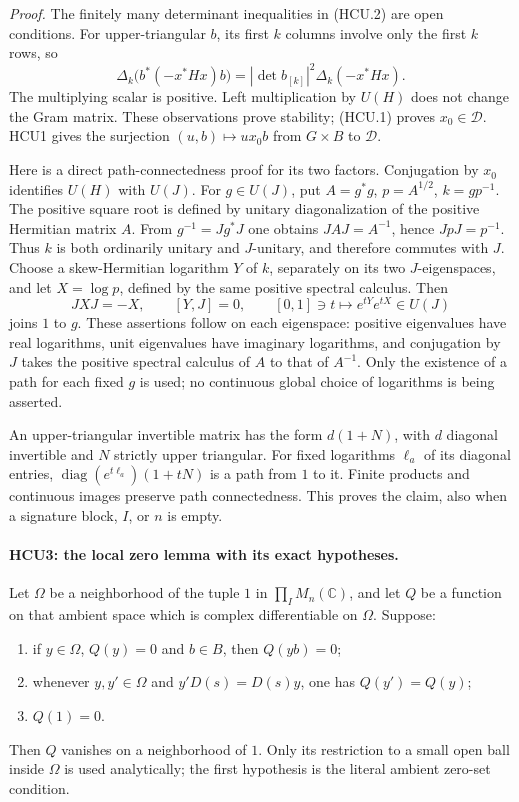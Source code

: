 \emph{Proof.}
The finitely many determinant inequalities in (HCU.2) are open
conditions.  For upper-triangular \(b\), its first \(k\) columns involve
only the first \(k\) rows, so
\[
 \Delta_k\bigl(b^*(-x^*Hx)b\bigr)
   =|\det b_{[k]}|^2\Delta_k(-x^*Hx).
 \tag{HCU.8}
\]
The multiplying scalar is positive.  Left multiplication by \(U(H)\)
does not change the Gram matrix.  These observations prove stability;
(HCU.1) proves \(x_0\in\mathcal D\).  HCU1 gives the surjection
\((u,b)\mapsto ux_0b\) from \(G\times B\) to \(\mathcal D\).

Here is a direct path-connectedness proof for its two factors.
Conjugation by \(x_0\) identifies \(U(H)\) with \(U(J)\).
For \(g\in U(J)\), put \(A=g^*g\), \(p=A^{1/2}\), \(k=gp^{-1}\).
The positive square root is defined by unitary diagonalization of the
positive Hermitian matrix \(A\).  From \(g^{-1}=Jg^*J\) one obtains
\(JAJ=A^{-1}\), hence \(JpJ=p^{-1}\).  Thus \(k\) is both ordinarily
unitary and \(J\)-unitary, and therefore commutes with \(J\).
Choose a skew-Hermitian logarithm \(Y\) of \(k\), separately on its
two \(J\)-eigenspaces, and let \(X=\log p\), defined by the same
positive spectral calculus.  Then
\[
 JXJ=-X,\qquad
 [Y,J]=0,\qquad
 [0,1]\ni t\longmapsto e^{tY}e^{tX}\in U(J)
 \tag{HCU.9}
\]
joins \(1\) to \(g\).  These assertions follow on each eigenspace:
positive eigenvalues have real logarithms, unit eigenvalues have
imaginary logarithms, and conjugation by \(J\) takes the positive
spectral calculus of \(A\) to that of \(A^{-1}\).  Only the existence
of a path for each fixed \(g\) is used; no continuous global choice of
logarithms is being asserted.

An upper-triangular invertible matrix has the form \(d(1+N)\), with
\(d\) diagonal invertible and \(N\) strictly upper triangular.
For fixed logarithms \(\ell_a\) of its diagonal entries,
\(\operatorname{diag}(e^{t\ell_a})(1+tN)\) is a path from \(1\) to it.
Finite products and continuous images preserve path connectedness.
This proves the claim, also when a signature block, \(I\), or \(n\)
is empty.

\paragraph{HCU3: the local zero lemma with its exact hypotheses.}
\label{claim:HCU3}
Let \(\Omega\) be a neighborhood of the tuple \(1\) in
\(\prod_I M_n(\mathbb C)\), and let \(Q\) be a function on that
ambient space which is complex differentiable on \(\Omega\).
Suppose:
\begin{enumerate}
\item if \(y\in\Omega\), \(Q(y)=0\) and \(b\in B\), then \(Q(yb)=0\);
\item whenever \(y,y'\in\Omega\) and \(y'D(s)=D(s)y\), one has
\(Q(y')=Q(y)\);
\item \(Q(1)=0\).
\end{enumerate}
Then \(Q\) vanishes on a neighborhood of \(1\).  Only its restriction
to a small open ball inside \(\Omega\) is used analytically;
the first hypothesis is the literal ambient zero-set condition.

